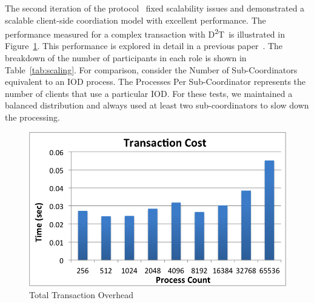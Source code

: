 \documentclass[conference]{sig-alt-gov2}
\newcommand{\DDT}{D\textsuperscript{2}T~}
\begin{document}
The second iteration of the protocol~\cite{lofstead:2013:pdsw-txn} fixed
scalability issues and demonstrated a scalable client-side coordiation model
with excellent performance. The performance measured for a complex transaction
with \DDT is illustrated in Figure~\ref{fig:performance}. This performance is
explored in detail in a previous paper~\cite{lofstead:2013:pdsw-txn}. The
breakdown of the number of participants in each role is shown in
Table~\ref{tab:scaling}. For comparison, consider the Number of
Sub-Coordinators equivalent to an IOD process. The Processes Per
Sub-Coordinator represents the number of clients that use a particular IOD. For
these tests, we maintained a balanced distribution and always used at least two
sub-coordinators to slow down the processing.

\begin{figure}[ht]
\centering
\includegraphics[keepaspectratio=true, width=0.9\columnwidth]{images/performance}
\vspace{-0.15in}
\caption{Total Transaction Overhead}
\label{fig:performance}
\vspace{-0.15in}
\end{figure}
\end{document}
